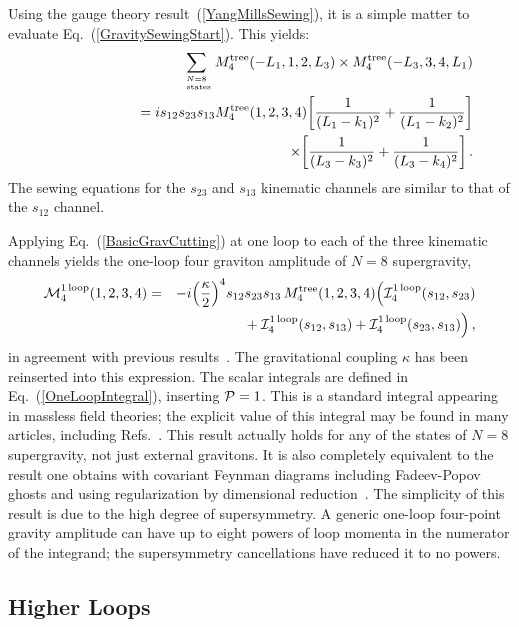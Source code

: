 Using the gauge theory result~(\ref{YangMillsSewing}), it is a simple
matter to evaluate Eq.~(\ref{GravitySewingStart}). This yields:
%
\begin{eqnarray}
&& \sum_{N=8 \atop \rm\ states}  M_4^{\rm tree}(-L_1, 1, 2, L_3) \times
  M_4^{\rm tree}(-L_3, 3, 4, L_1) \nonumber \\
&& \hskip 2 cm 
= i s_{12} s_{23} s_{13} M_4^{\rm tree}(1, 2, 3, 4)
 \biggl[{1\over (L_1 - k_1)^2 } + {1\over (L_1 - k_2)^2} \biggr] \nonumber \\
&& \hskip 5.03 cm \times
\biggl[{1\over (L_3 - k_3)^2 } + {1\over (L_3 - k_4)^2} \biggr]\,.
\label{BasicGravCutting}
\end{eqnarray}
%
The sewing equations for the $s_{23}$ and $s_{13}$ kinematic channels are
similar to that of the $s_{12}$ channel.

Applying Eq.~(\ref{BasicGravCutting}) at one loop to each of the three
kinematic channels yields the one-loop four graviton amplitude of $N=8$
supergravity,
%
\begin{eqnarray}
 {\cal M}_4^{{\rm 1\, loop}}(1, 2, 3, 4)
& = &  -i \Bigl( {\kappa \over 2}\Bigr)^4 
 s_{12} s_{23} s_{13}\,  M_4^{\rm tree}(1,2,3,4)  
 \Bigl(  {\cal I}_4^{{\rm 1\, loop}}(s_{12},s_{23}) \nonumber\\
&& \hskip 1.3 cm  
       \null    + {\cal I}_4^{{\rm 1\, loop}}(s_{12},s_{13})  
           + {\cal I}_4^{{\rm 1\, loop}}(s_{23},s_{13})  \Bigr) \,,
\end{eqnarray}
%
in agreement with previous results~\cite{GSB}.  The gravitational
 coupling $\kappa$ has been reinserted into this expression.  The
 scalar integrals are defined in Eq.~(\ref{OneLoopIntegral}),
 inserting ${\cal P} = 1$.  This is a standard integral appearing in
 massless field theories; the explicit value of this integral may be
 found in many articles, including Refs.~\cite{GSB,Long}.  This result
 actually holds for any of the states of $N=8$ supergravity, not just
 external gravitons.  It is also completely equivalent to the
 result one obtains with covariant Feynman diagrams including
 Fadeev-Popov~\cite{Faddeev} ghosts and using regularization by
 dimensional reduction~\cite{Siegel79DR}.  The simplicity of this
 result is due to the high degree of supersymmetry.  A generic
 one-loop four-point gravity amplitude can have up to eight powers of
 loop momenta in the numerator of the integrand; the supersymmetry
 cancellations have reduced it to no powers.

\subsection{Higher Loops}

